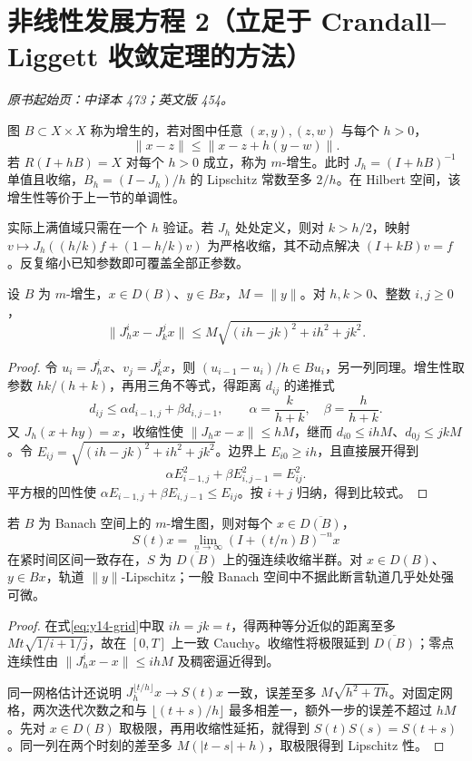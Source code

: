 \section{非线性发展方程 2（立足于 Crandall--Liggett 收敛定理的方法）}\label{sec:yosida-14-07}
\noindent\textit{原书起始页：中译本 473；英文版 454。}

\begin{definition}
图 $B\subset X\times X$ 称为增生的，若对图中任意 $(x,y),(z,w)$ 与每个 $h>0$，
\[
 \|x-z\|\le\|x-z+h(y-w)\|.
\]
若 $R(I+hB)=X$ 对每个 $h>0$ 成立，称为 $m$-增生。此时 $J_h=(I+hB)^{-1}$ 单值且收缩，$B_h=(I-J_h)/h$ 的 Lipschitz 常数至多 $2/h$。在 Hilbert 空间，该增生性等价于上一节的单调性。
\end{definition}

实际上满值域只需在一个 $h$ 验证。若 $J_h$ 处处定义，则对 $k>h/2$，映射 $v\mapsto J_h((h/k)f+(1-h/k)v)$ 为严格收缩，其不动点解决 $(I+kB)v=f$。反复缩小已知参数即可覆盖全部正参数。

\begin{lemma}[两组隐式网格的比较]\label{lem:y14-grid}
设 $B$ 为 $m$-增生，$x\in D(B)$、$y\in Bx$，$M=\|y\|$。对 $h,k>0$、整数 $i,j\ge0$，
\begin{equation}\label{eq:y14-grid}
 \|J_h^ix-J_k^jx\|
 \le M\sqrt{(ih-jk)^2+ih^2+jk^2}.
\end{equation}
\end{lemma}
\begin{proof}
令 $u_i=J_h^ix$、$v_j=J_k^jx$，则 $(u_{i-1}-u_i)/h\in Bu_i$，另一列同理。增生性取参数 $hk/(h+k)$，再用三角不等式，得距离 $d_{ij}$ 的递推式
\[
 d_{ij}\le\alpha d_{i-1,j}+\beta d_{i,j-1},\qquad
 \alpha=\frac{k}{h+k},\quad\beta=\frac{h}{h+k}.
\]
又 $J_h(x+hy)=x$，收缩性使 $\|J_hx-x\|\le hM$，继而 $d_{i0}\le ihM$、$d_{0j}\le jkM$。令 $E_{ij}=\sqrt{(ih-jk)^2+ih^2+jk^2}$。边界上 $E_{i0}\ge ih$，且直接展开得到
\[
 \alpha E_{i-1,j}^2+\beta E_{i,j-1}^2=E_{ij}^2.
\]
平方根的凹性使 $\alpha E_{i-1,j}+\beta E_{i,j-1}\le E_{ij}$。按 $i+j$ 归纳，得到比较式。
\end{proof}

\begin{theorem}\label{thm:y14-crandall-liggett}
若 $B$ 为 Banach 空间上的 $m$-增生图，则对每个 $x\in\overline{D(B)}$，
\[
 S(t)x=\lim_{n\to\infty}(I+(t/n)B)^{-n}x
\]
在紧时间区间一致存在，$S$ 为 $\overline{D(B)}$ 上的强连续收缩半群。对 $x\in D(B)$、$y\in Bx$，轨道 $\|y\|$-Lipschitz；一般 Banach 空间中不据此断言轨道几乎处处强可微。
\end{theorem}
\begin{proof}
在式\eqref{eq:y14-grid}中取 $ih=jk=t$，得两种等分近似的距离至多 $Mt\sqrt{1/i+1/j}$，故在 $[0,T]$ 上一致 Cauchy。收缩性将极限延到 $\overline{D(B)}$；零点连续性由 $\|J_h^ix-x\|\le ihM$ 及稠密逼近得到。

同一网格估计还说明 $J_h^{\lfloor t/h\rfloor}x\to S(t)x$ 一致，误差至多 $M\sqrt{h^2+Th}$。对固定网格，两次迭代次数之和与 $\lfloor(t+s)/h\rfloor$ 最多相差一，额外一步的误差不超过 $hM$。先对 $x\in D(B)$ 取极限，再用收缩性延拓，就得到 $S(t)S(s)=S(t+s)$。同一列在两个时刻的差至多 $M(|t-s|+h)$，取极限得到 Lipschitz 性。
\end{proof}

